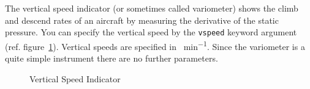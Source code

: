 The vertical speed indicator (or sometimes called variometer) shows the climb
and descend rates of an aircraft by measuring the derivative of the static
pressure. You can specify the vertical speed by the \texttt{vspeed} keyword
argument (ref. figure~\ref{fig:inst:vsi:basic}). Vertical speeds are specified
in \si{\feet\per\minute}. Since the variometer is a quite simple instrument
there are no further parameters.

\begin{figure}[!h]
\centering
{}
\caption{Vertical Speed Indicator}
\label{fig:inst:vsi:basic}
\end{figure}
